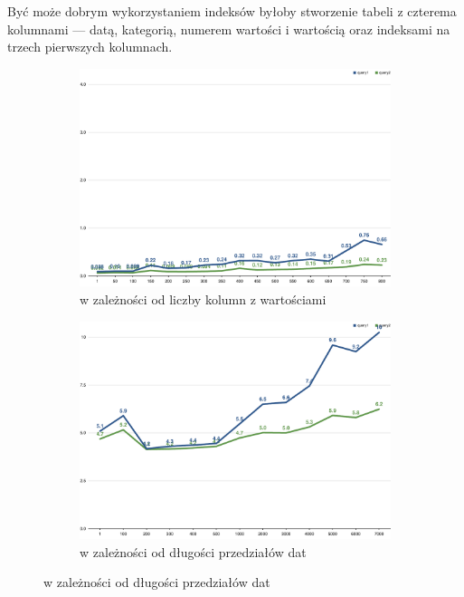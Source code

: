 \documentclass[a4paper,11pt]{article}
\begin{document}
Być może dobrym wykorzystaniem indeksów byłoby stworzenie tabeli z czterema kolumnami --- datą,
kategorią, numerem wartości i wartością oraz indeksami na trzech pierwszych kolumnach.
\begin{figure}[h!]
    \centering
    \begin{subfigure}{.49\textwidth}
        \centering
        \includegraphics[width=\textwidth]{charts/execution-time-sql-one-table-no-pk-number_of_values}
        \caption{w zależności od liczby kolumn z wartościami}
    \end{subfigure}
    \hfill
    \begin{subfigure}{.49\textwidth}
        \centering
        \includegraphics[width=\textwidth]{charts/execution-time-sql-one-table-no-pk-distance_in_days}
        \caption{w zależności od długości przedziałów dat}
    \end{subfigure}

\end{figure}
\end{document}
